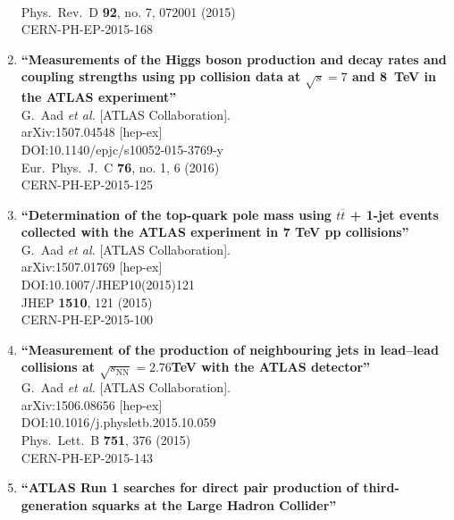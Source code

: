 \documentclass{article}
\begin{document}
\begin{enumerate}
  \\{}Phys.\ Rev.\ D {\bf 92}, no. 7, 072001 (2015)
  \\{}CERN-PH-EP-2015-168
\item%
{\bf ``Measurements of the Higgs boson production and decay rates and coupling strengths using pp collision data at $\sqrt{s}=7$ and 8 TeV in the ATLAS experiment''}
  \\{}G.~Aad {\it et al.} [ATLAS Collaboration].
  \\{}arXiv:1507.04548 [hep-ex]
  \\{}DOI:10.1140/epjc/s10052-015-3769-y
  \\{}Eur.\ Phys.\ J.\ C {\bf 76}, no. 1, 6 (2016)
  \\{}CERN-PH-EP-2015-125
\item%
{\bf ``Determination of the top-quark pole mass using $ t\overline{t} $ + 1-jet events collected with the ATLAS experiment in 7 TeV pp collisions''}
  \\{}G.~Aad {\it et al.} [ATLAS Collaboration].
  \\{}arXiv:1507.01769 [hep-ex]
  \\{}DOI:10.1007/JHEP10(2015)121
  \\{}JHEP {\bf 1510}, 121 (2015)
  \\{}CERN-PH-EP-2015-100
\item%
{\bf ``Measurement of the production of neighbouring jets in lead–lead collisions at $\sqrt{s_{\mathrm{NN}}} = 2.76$TeV with the ATLAS detector''}
  \\{}G.~Aad {\it et al.} [ATLAS Collaboration].
  \\{}arXiv:1506.08656 [hep-ex]
  \\{}DOI:10.1016/j.physletb.2015.10.059
  \\{}Phys.\ Lett.\ B {\bf 751}, 376 (2015)
  \\{}CERN-PH-EP-2015-143
\item%
{\bf ``ATLAS Run 1 searches for direct pair production of third-generation squarks at the Large Hadron Collider''}

\end{enumerate}
\end{document}
